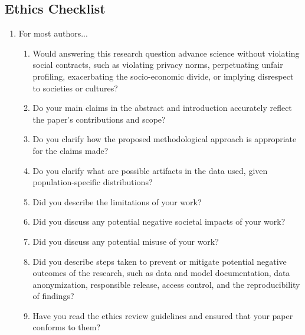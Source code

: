 \subsection{Ethics Checklist}

\begin{enumerate}

\item For most authors...
\begin{enumerate}
    \item  Would answering this research question advance science without violating social contracts, such as violating privacy norms, perpetuating unfair profiling, exacerbating the socio-economic divide, or implying disrespect to societies or cultures?
  \item Do your main claims in the abstract and introduction accurately reflect the paper's contributions and scope?
   \item Do you clarify how the proposed methodological approach is appropriate for the claims made? 
   \item Do you clarify what are possible artifacts in the data used, given population-specific distributions?
  \item Did you describe the limitations of your work?
  \item Did you discuss any potential negative societal impacts of your work?
  \item Did you discuss any potential misuse of your work?
    \item Did you describe steps taken to prevent or mitigate potential negative outcomes of the research, such as data and model documentation, data anonymization, responsible release, access control, and the reproducibility of findings?
  \item Have you read the ethics review guidelines and ensured that your paper conforms to them?
\end{enumerate}


\end{enumerate}
